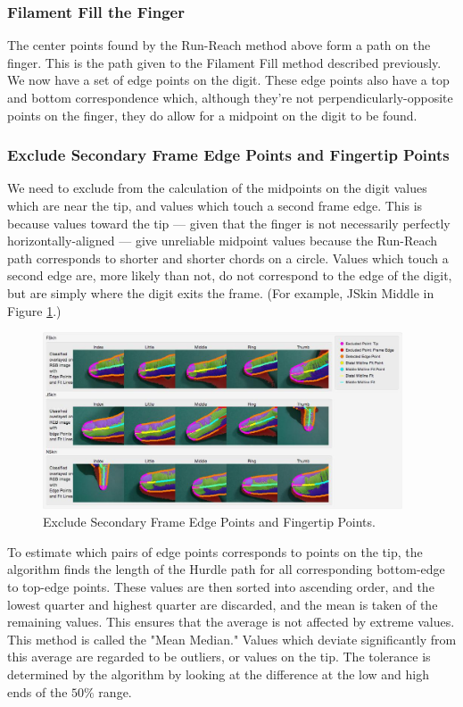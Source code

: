 \subsubsection{Filament Fill the Finger}\label{FilamentFillTheFinger}
The center points found by the Run-Reach method above form a path on the finger. This is the path given to the Filament Fill method described previously. We now have a set of edge points on the digit. These edge points also have a top and bottom correspondence which, although they're not perpendicularly-opposite points on the finger, they do allow for a midpoint on the digit to be found. 

\subsubsection{Exclude Secondary Frame Edge Points and Fingertip Points }\label{sec:ExcludeSecondaryFrameEdgePointsAndFingertipPoints}
We need to exclude from the calculation of the midpoints on the digit values which are near the tip, and values which touch a second frame edge. This is because values toward the tip --- given that the finger is not necessarily perfectly horizontally-aligned --- give unreliable midpoint values because the Run-Reach path corresponds to shorter and shorter chords on a circle. Values which touch a second edge are, more likely than not, do not correspond to the edge of the digit, but are simply where the digit exits the frame. (For example, JSkin Middle in Figure \ref{fig:ExcludedEdgePointsAndMidlineFit}.)

\begin{figure}[h!]
  \centering
    \includegraphics[width=0.95\textwidth]{Chapter4/Figs/ExcludedEdgePointsAndMidlineFit.jpg}
    \caption{Exclude Secondary Frame Edge Points and Fingertip Points.}\label{fig:ExcludedEdgePointsAndMidlineFit}
\end{figure}

To estimate which pairs of edge points corresponds to points on the tip, the algorithm finds the length of the Hurdle path for all corresponding bottom-edge to top-edge points. These values are then sorted into ascending order, and the lowest quarter and highest quarter are discarded, and the mean is taken of the remaining values. This ensures that the average is not affected by extreme values. This method is called the "Mean Median." Values which deviate significantly from this average are regarded to be outliers, or values on the tip. The tolerance is determined by the algorithm by looking at the difference at the low and high ends of the $50\%$ range.

